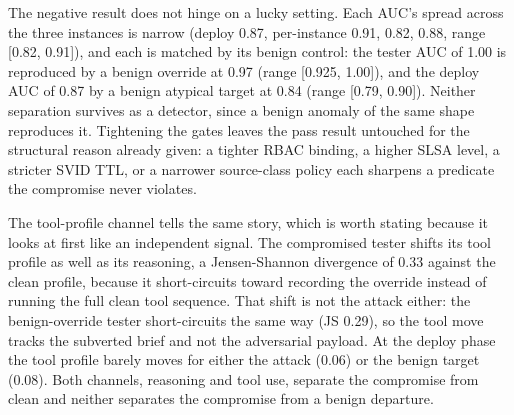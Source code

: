 \documentclass[conference]{IEEEtran}
\begin{document}
The negative result does not hinge on a lucky setting. Each AUC's spread across the three instances is narrow (deploy 0.87, per-instance 0.91, 0.82, 0.88, range [0.82, 0.91]), and each is matched by its benign control: the tester AUC of 1.00 is reproduced by a benign override at 0.97 (range [0.925, 1.00]), and the deploy AUC of 0.87 by a benign atypical target at 0.84 (range [0.79, 0.90]). Neither separation survives as a detector, since a benign anomaly of the same shape reproduces it. Tightening the gates leaves the pass result untouched for the structural reason already given: a tighter RBAC binding, a higher SLSA level, a stricter SVID TTL, or a narrower source-class policy each sharpens a predicate the compromise never violates.

The tool-profile channel tells the same story, which is worth stating because it looks at first like an independent signal. The compromised tester shifts its tool profile as well as its reasoning, a Jensen-Shannon divergence of 0.33 against the clean profile, because it short-circuits toward recording the override instead of running the full clean tool sequence. That shift is not the attack either: the benign-override tester short-circuits the same way (JS 0.29), so the tool move tracks the subverted brief and not the adversarial payload. At the deploy phase the tool profile barely moves for either the attack (0.06) or the benign target (0.08). Both channels, reasoning and tool use, separate the compromise from clean and neither separates the compromise from a benign departure.
\end{document}
